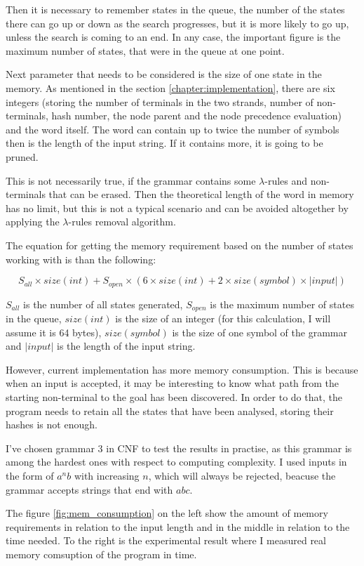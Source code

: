 Then it is necessary to remember states in the queue, the number of the states there can go up or down as the search progresses, but it is more likely to go up, unless the search is coming to an end. In any case, the important figure is the maximum number of states, that were in the queue at one point.

Next parameter that needs to be considered is the size of one state in the memory. As mentioned in the section \ref{chapter:implementation}, there are six integers (storing the number of terminals in the two strands, number of non-terminals, hash number, the node parent and the node precedence evaluation) and the word itself. The word can contain up to twice the number of symbols then is the length of the input string. If it contains more, it is going to be pruned.

This is not necessarily true, if the grammar contains some $\lambda$-rules and non-terminals that can be erased. Then the theoretical length of the word in memory has no limit, but this is not a typical scenario and can be avoided altogether by applying the $\lambda$-rules removal algorithm.

The equation for getting the memory requirement based on the number of states working with is than the following:

$$S_{all} \times size(int) + S_{open} \times (6 \times size(int) + 2 \times size(symbol) \times |input|)$$

$S_{all}$ is the number of all states generated, $S_{open}$ is the maximum number of states in the queue, $size(int)$ is the size of an integer (for this calculation, I will assume it is 64 bytes), $size(symbol)$ is the size of one symbol of the grammar and $|input|$ is the length of the input string.

However, current implementation has more memory consumption. This is because when an input is accepted, it may be interesting to know what path from the starting non-terminal to the goal has been discovered. In order to do that, the program needs to retain all the states that have been analysed, storing their hashes is not enough.

I've chosen grammar 3 in CNF to test the results in practise, as this grammar is among the hardest ones with respect to computing complexity. I used inputs in the form of $a^nb$ with increasing $n$, which will always be rejected, beacuse the grammar accepts strings that end with $abc$.

The figure \ref{fig:mem_consumption} on the left show the amount of memory requirements in relation to the input length and in the middle in relation to the time needed. To the right is the experimental result where I measured real memory comsuption of the program in time.

